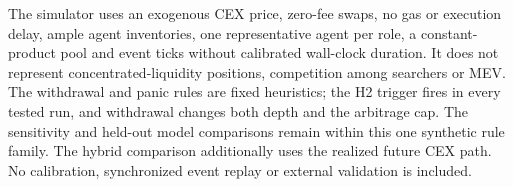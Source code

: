 The simulator uses an exogenous CEX price, zero-fee swaps, no gas or execution delay, ample agent inventories, one representative agent per role, a constant-product pool and event ticks without calibrated wall-clock duration. It does not represent concentrated-liquidity positions, competition among searchers or MEV. The withdrawal and panic rules are fixed heuristics; the H2 trigger fires in every tested run, and withdrawal changes both depth and the arbitrage cap. The sensitivity and held-out model comparisons remain within this one synthetic rule family. The hybrid comparison additionally uses the realized future CEX path. No calibration, synchronized event replay or external validation is included.
